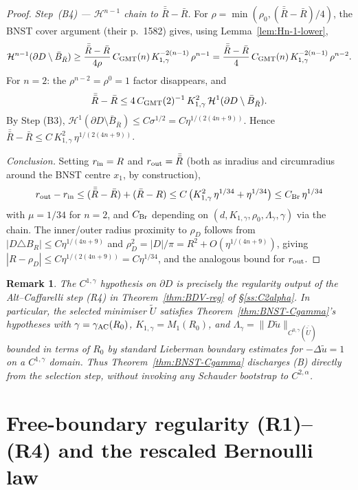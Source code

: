 \documentclass[11pt]{amsart}
\newtheorem{remark}[theorem]{Remark}
\newcommand{\wt}{\widetilde}
\begin{document}
\begin{proof}
\emph{Step~(B4) — $\mathcal H^{n-1}$ chain to $\bar{\bar R}-\bar R$.}
For $\rho=\min(\rho_0,(\bar{\bar R}-\bar R)/4)$, the BNST cover
argument (their p.~1582) gives, using
Lemma~\ref{lem:Hn-1-lower},
\[
\mathcal H^{n-1}(\partial D\setminus\bar B_{\bar R})
\ge\frac{\bar{\bar R}-\bar R}{4\rho}\,
C_{\rm GMT}(n)\,K_{1,\gamma}^{-2(n-1)}\,\rho^{n-1}
=\frac{\bar{\bar R}-\bar R}{4}\,
C_{\rm GMT}(n)\,K_{1,\gamma}^{-2(n-1)}\,\rho^{n-2}.
\]
For $n=2$: the $\rho^{n-2}=\rho^0=1$ factor disappears, and
\[
\bar{\bar R}-\bar R\le 4\,C_{\rm GMT}(2)^{-1}\,K_{1,\gamma}^{2}\,
\mathcal H^{1}(\partial D\setminus\bar B_{\bar R}).
\]
By Step (B3), $\mathcal H^1(\partial D\setminus\bar B_{\bar R})\le
C\sigma^{1/2}=C\eta^{1/(2(4n+9))}$.  Hence
$\bar{\bar R}-\bar R\le C\,K_{1,\gamma}^2\,\eta^{1/(2(4n+9))}$.

\emph{Conclusion.}
Setting $r_{\rm in}=R$ and $r_{\rm out}=\bar{\bar R}$ (both as
inradius and circumradius around the BNST centre $x_1$, by
construction),
\[
r_{\rm out}-r_{\rm in}\le(\bar{\bar R}-\bar R)+(\bar R-R)\le
C\,\bigl(K_{1,\gamma}^2\,\eta^{1/34}+\eta^{1/34}\bigr)
\le C_{\rm Br}\,\eta^{1/34}
\]
with $\mu=1/34$ for $n=2$, and $C_{\rm Br}$ depending on
$(d,K_{1,\gamma},\rho_0,\Lambda_\gamma,\gamma)$ via the chain.  The
inner/outer radius proximity to $\rho_D$ follows from
$|D\triangle B_R|\le C\eta^{1/(4n+9)}$ and $\rho_D^2=|D|/\pi=R^2+
O(\eta^{1/(4n+9)})$, giving $|R-\rho_D|\le C\eta^{1/(2(4n+9))}=
C\eta^{1/34}$, and the analogous bound for $r_{\rm out}$.
\end{proof}

\begin{remark}\label{rem:Cgamma-from-AC}
The $C^{1,\gamma}$ hypothesis on $\partial D$ is precisely the
regularity output of the Alt--Caffarelli step (R4) in
Theorem~\ref{thm:BDV-reg} of \S\ref{ss:C2alpha}.
In particular, the selected minimiser $\wt U$ satisfies
Theorem~\ref{thm:BNST-Cgamma}'s hypotheses with
$\gamma=\gamma_{\rm AC}(R_0)$, $K_{1,\gamma}=M_1(R_0)$, and
$\Lambda_\gamma=\|D\wt u\|_{C^{0,\gamma}(\overline{\wt U})}$ bounded
in terms of $R_0$ by standard Lieberman boundary estimates for
$-\Delta\wt u=1$ on a $C^{1,\gamma}$ domain.  Thus
Theorem~\ref{thm:BNST-Cgamma} discharges (B) directly from the
selection step, without invoking any Schauder bootstrap to
$C^{2,\alpha}$.
\end{remark}

\section{Free-boundary regularity (R1)--(R4) and the rescaled
Bernoulli law}\label{sec:BDV-FB-detail}
\end{document}
